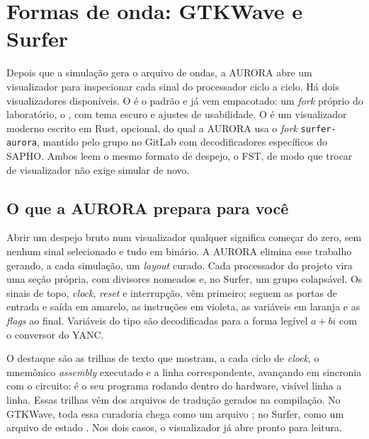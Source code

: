 \chapter{Formas de onda: GTKWave e Surfer}
\label{cap:ondas}

Depois que a simulação gera o arquivo de ondas, a AURORA abre um visualizador para inspecionar cada sinal do processador ciclo a ciclo. Há dois visualizadores disponíveis. O  é o padrão e já vem empacotado: um \textit{fork} próprio do laboratório, o , com tema escuro e ajustes de usabilidade. O  é um visualizador moderno escrito em Rust, opcional, do qual a AURORA usa o \textit{fork} \texttt{surfer-aurora}, mantido pelo grupo no GitLab com decodificadores específicos do SAPHO. Ambos leem o mesmo formato de despejo, o FST, de modo que trocar de visualizador não exige simular de novo.


\section{O que a AURORA prepara para você}
\label{sec:curadoria-ondas}

Abrir um despejo bruto num visualizador qualquer significa começar do zero, sem nenhum sinal selecionado e tudo em binário. A AURORA elimina esse trabalho gerando, a cada simulação, um \textit{layout} curado. Cada processador do projeto vira uma seção própria, com divisores nomeados e, no Surfer, um grupo colapsável. Os sinais de topo, \textit{clock}, \textit{reset} e interrupção, vêm primeiro; seguem as portas de entrada e saída em amarelo, as instruções em violeta, as variáveis em laranja e as \textit{flags} ao final. Variáveis do tipo  são decodificadas para a forma legível $a+bi$ com o conversor  do YANC.

O destaque são as trilhas de texto que mostram, a cada ciclo de \textit{clock}, o mnemônico \textit{assembly} executado e a linha \cmm{} correspondente, avançando em sincronia com o circuito: é o seu programa rodando dentro do hardware, visível linha a linha. Essas trilhas vêm dos arquivos de tradução gerados na compilação. No GTKWave, toda essa curadoria chega como um arquivo ; no Surfer, como um arquivo de estado . Nos dois casos, o visualizador já abre pronto para leitura.

